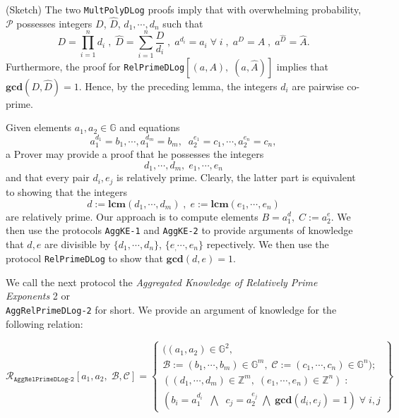 \documentclass[11pt, lettersize, notitlepage, leqno, footskip=0.6cm]{article}
\newcommand{\bz}{\mathbb Z}
\newcommand{\pl}{\prod\limits}
\newcommand{\slim}{\sum\limits}
\newcommand{\ttt}{\texttt}
\newcommand{\mc}{\mathcal}
\newcommand{\mb}{\mathbb}
\newcommand{\mbf}{\mathbf}
\newcommand{\what}{\widehat}
\newcommand{\mP}{\mc{P}}
\newcommand{\vs}{\vspace{-0.15cm}}
\newcommand{\noin}{\noindent}
\newcommand{\op}{overwhelming probability}
\newcommand{\LCM}{\mbf{lcm}}
\newcommand{\GCD}{\mbf{gcd}}
\numberwithin{equation}{section}
\begin{document}
\begin{prf} (Sketch) The two \verb|MultPolyDLog| proofs imply that with \op, $\mP$ possesses integers $D$, $\what{D}$, $d_1,\cdots,d_n$ such that \vs $$D = \pl_{i=1}^n d_i\;,\;\what{D} = \slim_{i=1}^n \frac{D}{d_i}   \;,\;a^{d_i} = a_i\;\forall\;i \;,\;a^{D} = A\;,\; a^{\what{D}} = \what{A} .$$ Furthermore, the proof for \verb|RelPrimeDLog|$[(a,A),\;(a,\what{A})]$ implies that $\GCD(D,\what{D}) = 1$. Hence, by the preceding lemma, the integers $d_i$ are pairwise co-prime.\end{prf}



\bigskip

\noin Given elements $a_1, a_2\in \mb{G}$ and equations \vspace{-0.15cm}$$a_1^{d_1} = b_1,\cdots, a_1^{d_m}= b_m,\;\; a_2^{e_1} = c_1,\cdots, a_2^{e_n} = c_n,$$ a Prover may provide a proof that he possesses the integers \vs $$d_1,\cdots, d_m,\;e_1,\cdots, e_n$$ and that every pair $d_i, e_j$ is relatively prime. Clearly, the latter part is equivalent to showing that the integers \vs $$d:=\LCM(d_1,\cdots, d_m)\;,\;e:=\LCM(e_1,\cdots, e_n)$$ are relatively prime. Our approach is to compute elements $B = a_1^d,\;C:= a_2^{e}$. We then use the protocols \verb|AggKE-1| and \verb|AggKE-2| to provide arguments of knowledge that $d, e$ are divisible by $\{d_1,\cdots, d_n \}$, $\{e_,\cdots,e_n \}$ repectively. We then  use the protocol \verb|RelPrimeDLog| to show that $\GCD(d, e) = 1$.


We call the next protocol the \textit{Aggregated Knowledge of Relatively Prime Exponents} 2 or\\ \verb|AggRelPrimeDLog-2| for short. We provide an argument of knowledge for the following relation:\vspace{-0.3cm}

\[
  \mc{R}_{\ttt{AggRelPrimeDLog-2}}[a_1, a_2,\; \mc{B}, \mc{C}] = \left\{\begin{array}{l}
    ((a_1,a_2)\in\mb{G}^2,\;\\
     \mc{B}:=(b_1,\cdots, b_m)\in\mb{G}^m,\;\mc{C}:= (c_1,\cdots, c_n)\in\mb{G}^n);\\
    ((d_1,\cdots,d_m)\in\bz^m,\; (e_1,\cdots,e_n)\in\bz^n)\;: \\
    (b_i = a_1^{d_i}\;\;\bigwedge\;\; c_j = a_2^{e_j}\;\bigwedge\; \GCD(d_i, e_j) = 1)\;\forall \;i,j   	
  \end{array}\right\}
\] 

\vspace{0.1cm}
\end{document}
